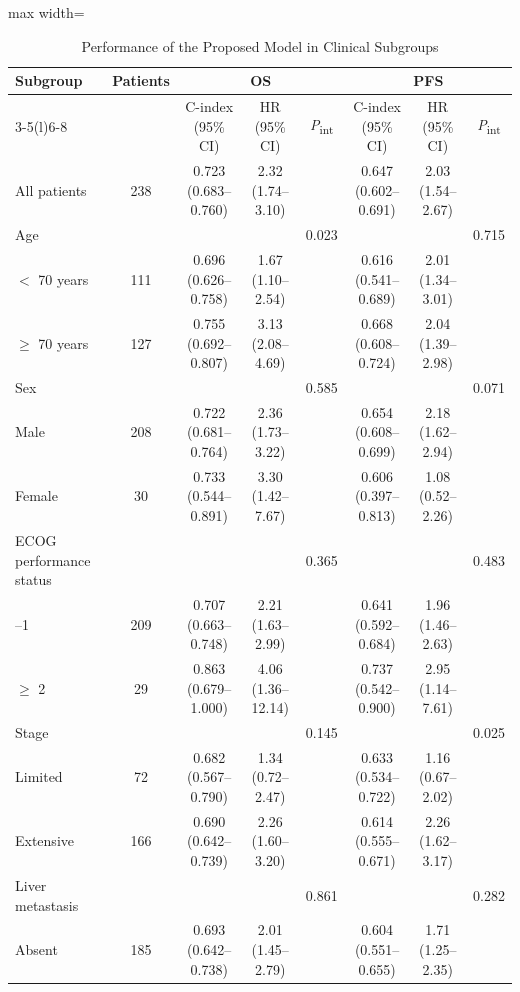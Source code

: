 \begin{table}[htbp]
\centering
\setlength{\belowcaptionskip}{4pt}
\caption{Performance of the Proposed Model in Clinical Subgroups}
\label{tab:subgroups}
\footnotesize\setlength{\tabcolsep}{2.5pt}
\begin{adjustbox}{max width=\textwidth}
\begin{tabular}{@{}lc ccc ccc@{}}
\toprule
Subgroup & Patients & \multicolumn{3}{c}{OS} & \multicolumn{3}{c}{PFS} \\
\cmidrule(lr){3-5}\cmidrule(l){6-8}
 & & C-index (95\% CI) & HR (95\% CI) & \textit{P}\textsubscript{int} & C-index (95\% CI) & HR (95\% CI) & \textit{P}\textsubscript{int} \\
\midrule
All patients & 238 & 0.723 (0.683--0.760) & 2.32 (1.74--3.10) & & 0.647 (0.602--0.691) & 2.03 (1.54--2.67) & \\
\addlinespace
Age & & & & 0.023 & & & 0.715 \\
\quad $<$ 70 years & 111 & 0.696 (0.626--0.758) & 1.67 (1.10--2.54) & & 0.616 (0.541--0.689) & 2.01 (1.34--3.01) & \\
\quad $\geq$ 70 years & 127 & 0.755 (0.692--0.807) & 3.13 (2.08--4.69) & & 0.668 (0.608--0.724) & 2.04 (1.39--2.98) & \\
Sex & & & & 0.585 & & & 0.071 \\
\quad Male & 208 & 0.722 (0.681--0.764) & 2.36 (1.73--3.22) & & 0.654 (0.608--0.699) & 2.18 (1.62--2.94) & \\
\quad Female & 30 & 0.733 (0.544--0.891) & 3.30 (1.42--7.67) & & 0.606 (0.397--0.813) & 1.08 (0.52--2.26) & \\
ECOG performance status & & & & 0.365 & & & 0.483 \\
\quad 0--1 & 209 & 0.707 (0.663--0.748) & 2.21 (1.63--2.99) & & 0.641 (0.592--0.684) & 1.96 (1.46--2.63) & \\
\quad $\geq$ 2 & 29 & 0.863 (0.679--1.000) & 4.06 (1.36--12.14) & & 0.737 (0.542--0.900) & 2.95 (1.14--7.61) & \\
Stage & & & & 0.145 & & & 0.025 \\
\quad Limited & 72 & 0.682 (0.567--0.790) & 1.34 (0.72--2.47) & & 0.633 (0.534--0.722) & 1.16 (0.67--2.02) & \\
\quad Extensive & 166 & 0.690 (0.642--0.739) & 2.26 (1.60--3.20) & & 0.614 (0.555--0.671) & 2.26 (1.62--3.17) & \\
Liver metastasis & & & & 0.861 & & & 0.282 \\
\quad Absent & 185 & 0.693 (0.642--0.738) & 2.01 (1.45--2.79) & & 0.604 (0.551--0.655) & 1.71 (1.25--2.35) & \\

\end{tabular}
\end{adjustbox}
\end{table}
